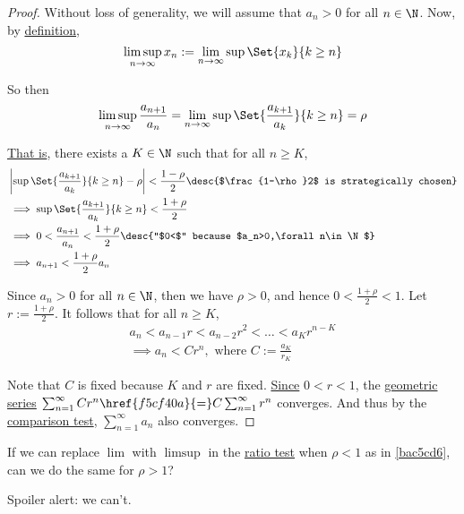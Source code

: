 \begin{proof}
  Without loss of generality, we will assume that $a_n>0$ for all $n\in\N$. Now,
  by \href{f4f2af4}{definition},
  $$
    \limsup_{n\to\infty}x_n:=\lim_{n\to\infty}\sup\Set{x_k}{k\geq n}
  $$

  So then
  $$
    \limsup_{n\to\infty}\frac{a_{n+1}}{a_n}
    =\lim_{n\to\infty}\sup\Set{\frac{a_{k+1}}{a_k}}{k\geq n}=\rho
  $$

  \href{e565120}{That is}, there exists a $K\in\N$ such that for all $n\geq K$,
  \begin{align*}
     &\left|\sup\Set{\frac{a_{k+1}}{a_k}}{k\geq n}-\rho\right|<\frac{1-\rho}2\desc{$\frac{1-\rho}2$ is strategically chosen} \\
     &\implies\sup\Set{\frac{a_{k+1}}{a_k}}{k\geq n}<\frac{1+\rho}2                                                          \\
     &\implies0<\frac{a_{n+1}}{a_n}<\frac{1+\rho}2\desc{``$0<$" because $a_n>0,\forall n\in\N$}                              \\
     &\implies a_{n+1}<\frac{1+\rho}2a_n
  \end{align*}

  Since $a_n>0$ for all $n\in\N$, then we have $\rho>0$, and hence
  $0<\frac{1+\rho}2<1$. Let $r:=\frac{1+\rho}2$. It follows that for all $n\geq
  K$,
  \begin{gather*}
    a_n<a_{n-1}r<a_{n-2}r^2<\ldots<a_Kr^{n-K}\\
    \implies a_n<Cr^n, \text{ where } C:=\frac{a_K}{r_K}
  \end{gather*}

  Note that $C$ is fixed because $K$ and $r$ are fixed. \href{fca26f6}{Since}
  $0<r<1$, the \href{ae21a85}{geometric series} $\sum_{n=1}^\infty
  Cr^n\href{f5cf40a}{=}C\sum_{n=1}^\infty r^n$ converges. And thus by the
  \href{d0856d6}{comparison test}, $\sum_{n=1}^\infty a_n$ also converges.
\end{proof}

\label{cb47926}

If we can replace $\lim$ with $\limsup$ in the \href{cb7b15b}{ratio test} when
$\rho<1$ as in \autoref{bac5cd6}, can we do the same for $\rho>1$?

Spoiler alert: we can't.

